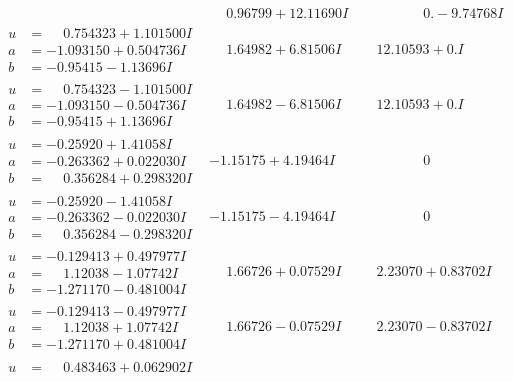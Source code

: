 \documentclass[1p]{elsarticle_modified}
\theoremstyle{definition}
\begin{document}
$$\begin{array}{c|c|c}
 & \phantom{-}0.96799 + 12.11690 I & \phantom{-0.000000 } 0. - 9.74768 I \\ \hline\begin{aligned}
u &= \phantom{-}0.754323 + 1.101500 I \\
a &= -1.093150 + 0.504736 I \\
b &= -0.95415 - 1.13696 I\end{aligned}
 & \phantom{-}1.64982 + 6.81506 I & \phantom{-}12.10593 + 0. I\phantom{ +0.000000I} \\ \hline\begin{aligned}
u &= \phantom{-}0.754323 - 1.101500 I \\
a &= -1.093150 - 0.504736 I \\
b &= -0.95415 + 1.13696 I\end{aligned}
 & \phantom{-}1.64982 - 6.81506 I & \phantom{-}12.10593 + 0. I\phantom{ +0.000000I} \\ \hline\begin{aligned}
u &= -0.25920 + 1.41058 I \\
a &= -0.263362 + 0.022030 I \\
b &= \phantom{-}0.356284 + 0.298320 I\end{aligned}
 & -1.15175 + 4.19464 I & \phantom{-0.000000 } 0 \\ \hline\begin{aligned}
u &= -0.25920 - 1.41058 I \\
a &= -0.263362 - 0.022030 I \\
b &= \phantom{-}0.356284 - 0.298320 I\end{aligned}
 & -1.15175 - 4.19464 I & \phantom{-0.000000 } 0 \\ \hline\begin{aligned}
u &= -0.129413 + 0.497977 I \\
a &= \phantom{-}1.12038 - 1.07742 I \\
b &= -1.271170 - 0.481004 I\end{aligned}
 & \phantom{-}1.66726 + 0.07529 I & \phantom{-}2.23070 + 0.83702 I \\ \hline\begin{aligned}
u &= -0.129413 - 0.497977 I \\
a &= \phantom{-}1.12038 + 1.07742 I \\
b &= -1.271170 + 0.481004 I\end{aligned}
 & \phantom{-}1.66726 - 0.07529 I & \phantom{-}2.23070 - 0.83702 I \\ \hline\begin{aligned}
u &= \phantom{-}0.483463 + 0.062902 I \\

\end{aligned}
\end{array}$$
\end{document}
